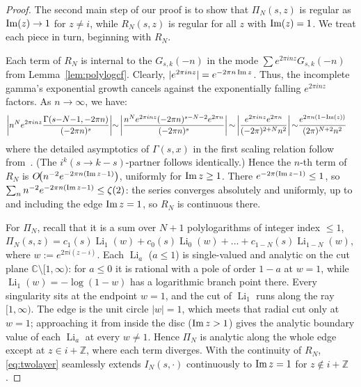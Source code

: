 \documentclass[11pt]{article}
\newcommand{\ZZ}{\mathbb{Z}}
\newcommand{\CC}{\mathbb{C}}
\DeclareMathOperator{\Li}{Li}
\begin{document}
\begin{proof}
The second main step of our proof is to show that $\Pi_N(s, z)$ is regular as 
${\rm Im}(z) \to 1$ for $z \neq i$, while $R_N(s, z)$ is regular for all $z$ with 
${\rm Im}(z) = 1$. We treat each piece in turn, beginning with $R_N$.


Each term of $R_N$ is internal to the $G_{s,k}(-n)$ in the mode $\sum e^{2\pi inz} G_{s,k}(-n)$ 
from Lemma~\ref{lem:polylogcf}. Clearly, $|e^{2\pi inz}|=e^{-2\pi n\,{\rm Im}\,z}$. Thus, the 
incomplete gamma's exponential growth cancels against the exponentially 
falling $e^{2 \pi i n z}$ factors. As $n \to \infty$, we have:
\begin{align}
\left|n^N e^{2\pi i n z} \frac{\Gamma(s{-}N{-}1,{-}2\pi n)}{({-}2\pi n)^s}\right| &
{\sim}\left| \frac{n^N e^{2\pi i n z} ({-}2\pi n)^{s{-}N{-}2}e^{2\pi n}}{({-}2\pi n)^s}\right|
{\sim}\left| \frac{e^{2\pi i n z}e^{2\pi n}}{ ({-}2\pi)^{2{+}N} n^2}\right|
{\sim} \frac{e^{2\pi n (1{-}{\rm Im}(z))}}{(2\pi)^{N{+}2} n^2}%
\end{align}
where the detailed asymptotics of $\Gamma(s, x)$ in the first scaling relation follow 
from~\cite[\S8.11]{DLMF}. (The $i^k (s \rightarrow k-s)$-partner follows identically.)
Hence the $n$-th term of $R_N$ is $O\!\big(n^{-2}e^{-2\pi n({\rm Im}\,z-1)}\big)$, uniformly for
${\rm Im}\,z\ge1$. There $e^{-2\pi({\rm Im}\,z-1)}\le1$, so
$\sum_{n}n^{-2}e^{-2\pi n({\rm Im}\,z-1)}\le\zeta(2)$: the series converges absolutely and uniformly,
up to and including the edge ${\rm Im}\,z=1$, so $R_N$ is continuous there.

For $\Pi_N$, recall that it is a sum over $N+1$ polylogarithms of integer index $\le1$,
$\Pi_N(s, z) = c_1(s) \Li_1(w) + c_0(s) \Li_0(w) + ... + c_{1{-}N}(s) \Li_{1{-}N}(w)$, where $w := e^{2\pi i (z-i)}$.
Each $\Li_a$ ($a\le1$) is single-valued and analytic on the cut plane
$\CC\setminus[1,\infty)$: for $a\le0$ it is rational with a pole of order $1-a$ at $w=1$, while
$\Li_1(w)=-\log(1-w)$ has a logarithmic branch point there. Every singularity sits at the endpoint
$w=1$, and the cut of $\Li_1$ runs along the ray $[1,\infty)$. The edge is the unit circle
$|w|=1$, which meets that radial cut only at $w=1$; approaching it from inside the disc
(${\rm Im}\,z>1$) gives the analytic boundary value of each $\Li_a$ at every $w\ne1$. Hence
$\Pi_N$ is analytic along the whole edge except at $z\in i+\ZZ$, where each term
diverges. With the continuity of $R_N$, \eqref{eq:twolayer} seamlessly extends
$I_N(s,\cdot)$ continuously to ${\rm Im}\,z=1$ for $z\notin i+\ZZ$.
\end{proof}
\end{document}
